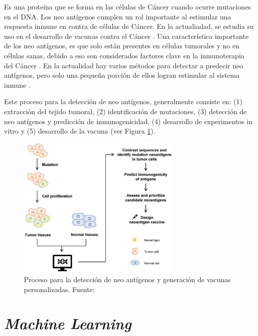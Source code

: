 Es una proteína que se forma en las células de Cáncer cuando ocurre mutaciones en el DNA. Los neo antígenos cumplen un rol importante al estimular una respuesta inmune en contra de células de Cáncer. En la actualiadad, se estudia su uso en el desarrollo de vacunas contra el Cáncer \cite{NCIdictionary2022}. Una característica importante de los neo antígenos, es que solo están presentes en células tumorales y no en células sanas, debido a eso son considerados factores clave en la inmunoterapia del Cáncer \cite{borden2022cancer}. En la actualidad hay varios métodos para detectar a predecir neo antígenos, pero solo una pequeña porción de ellos logran estimular al sistema inmune \cite{chen2021challenges, hao2021improvement}.

 Este proceso para la detección de neo antígenos, generalmente consiste en: (1) extracción del tejido tumoral, (2) identificación de mutaciones, (3) detección de neo antígenos y predicción de inmunogenicidad, (4) desarrollo de experimentos in vitro y (5) desarrollo de la vacuna \citep{de2020neoantigen, peng2019neoantigen} (ver Figura \ref{fig:process}). \\

\begin{figure}[H]
	\centering
	\includegraphics[width=0.7\textwidth]{img/neoantigen/process}	
	\caption{Proceso para la detección de neo antígenos y generación de vacunas personalizadas. Fuente: \citep{de2020neoantigen} }
	\label{fig:process}
\end{figure}


\section{\textit{Machine Learning}}


